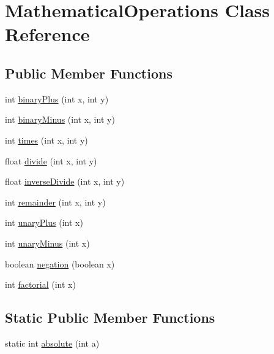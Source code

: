 \hypertarget{class_mathematical_operations}{}\section{Mathematical\+Operations Class Reference}
\label{class_mathematical_operations}
\subsection*{Public Member Functions}
\begin{DoxyCompactItemize}
\item 
int \hyperlink{class_mathematical_operations_a868e597064506a61471151a8eedcf545}{binary\+Plus} (int x, int y)
\item 
int \hyperlink{class_mathematical_operations_af981d2acd45d0d746aff032f4592773a}{binary\+Minus} (int x, int y)
\item 
int \hyperlink{class_mathematical_operations_a9f19cdc5c2bc10ab20aa420760f88d83}{times} (int x, int y)
\item 
float \hyperlink{class_mathematical_operations_ab944d150b4e02a0220e2c670d38ee38e}{divide} (int x, int y)
\item 
float \hyperlink{class_mathematical_operations_a2ad260f5768c80c7e2229141a6548c8c}{inverse\+Divide} (int x, int y)
\item 
int \hyperlink{class_mathematical_operations_a6d6ab90f694df1514de0e09adef51be5}{remainder} (int x, int y)
\item 
int \hyperlink{class_mathematical_operations_a59825e8e4c9e3ef2873df745872a2404}{unary\+Plus} (int x)
\item 
int \hyperlink{class_mathematical_operations_a4e9a3c6b111c7c58b4d77380ba2f543b}{unary\+Minus} (int x)
\item 
boolean \hyperlink{class_mathematical_operations_a443073f664c48f55c8ebc68c502e24e3}{negation} (boolean x)
\item 
int \hyperlink{class_mathematical_operations_ae2020b6c1d9036a04f9b05672db8ecca}{factorial} (int x)
\end{DoxyCompactItemize}
\subsection*{Static Public Member Functions}
\begin{DoxyCompactItemize}
\item 
static int \hyperlink{class_mathematical_operations_a709711906bb785d0a21480ed47480d2e}{absolute} (int a)
\end{DoxyCompactItemize}


